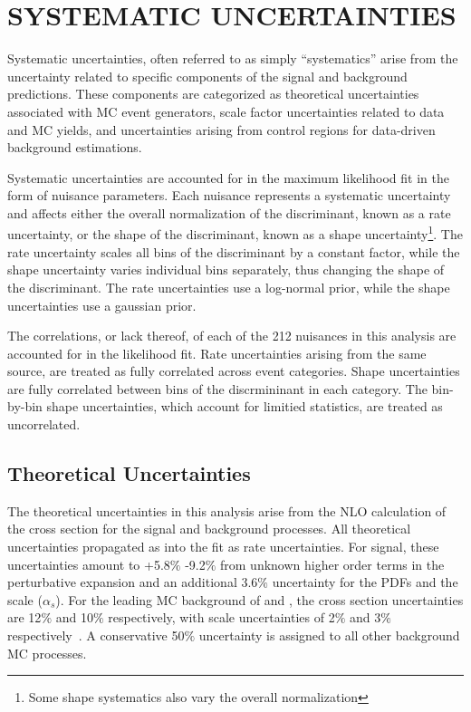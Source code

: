 %
%

\chapter{SYSTEMATIC UNCERTAINTIES}
Systematic uncertainties, often referred to as simply ``systematics'' arise from the uncertainty related to specific components of the signal
and background predictions. These components are categorized as theoretical uncertainties associated with MC event generators, scale factor uncertainties
related to data and MC yields, and uncertainties arising from control regions for data-driven background estimations.  

Systematic uncertainties are accounted for in the maximum likelihood fit in the form of nuisance parameters. Each nuisance represents a systematic uncertainty
and affects either the overall normalization of the discriminant, known as a rate uncertainty, or the shape of the discriminant,
known as a shape uncertainty\footnote{Some shape systematics also vary the overall normalization}. The rate uncertainty scales all bins of the discriminant
by a constant factor, while the shape uncertainty varies individual bins separately, thus changing the shape of the discriminant.
The rate uncertainties use a log-normal prior, while the shape uncertainties use a gaussian prior. 

The correlations, or lack thereof, of each of the 212 nuisances in this analysis are accounted for in the likelihood fit. 
Rate uncertainties arising from the same source, are treated as fully correlated across event categories. Shape uncertainties are fully correlated between
bins of the discrmininant in each category. The bin-by-bin shape uncertainties, which account for limitied statistics, are treated as uncorrelated. 


\section{Theoretical Uncertainties}
The theoretical uncertainties in this analysis arise from the NLO calculation of the cross section for the signal and background processes.
All theoretical uncertainties propagated as into the fit as rate uncertainties. For \tth signal,
these uncertainties amount to +5.8$\%$ -9.2$\%$ from unknown higher order terms in the perturbative expansion and an additional 3.6$\%$ uncertainty for the
PDFs and the scale ($\alpha_{s}$). For the leading MC background of \ttw and \ttz, the cross section uncertainties are 12$\%$ and 10$\%$ respectively, with
scale uncertainties of 2$\%$ and 3$\%$ respectively~\cite{xsec_uncert}. A conservative 50$\%$ uncertainty is assigned to all other background MC processes. 

